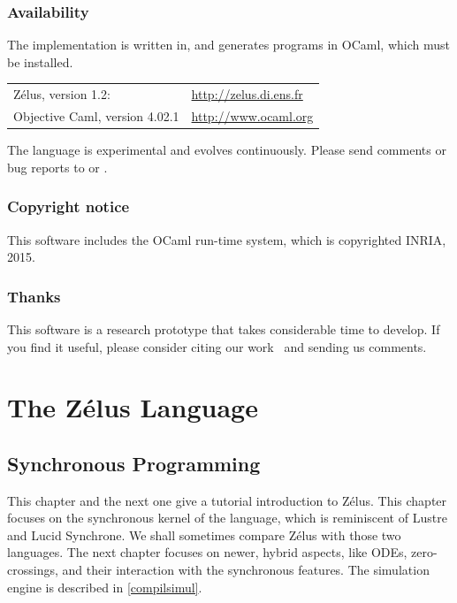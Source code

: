 \documentclass[11pt,titlepage,twoside]{report}
\newcommand{\zelus}{{\sf Z\'elus}}
\newcommand{\lustre}{{\sf Lustre}}
\newcommand{\lucy}{{\sf Lucid Synchrone}}
\newcommand{\ocaml}{{\sf OCaml}}
\begin{document}
\section*{Availability\label{availability}}
The implementation is written in, and generates programs in \ocaml, which 
must be installed.
\begin{center}
\begin{tabular}{ll}
  \zelus, version 1.2:  & \url{http://zelus.di.ens.fr} \\
  Objective Caml, version 4.02.1  & \url{http://www.ocaml.org}
\end{tabular}
\end{center}
The language is experimental and evolves continuously. Please send
comments or bug reports to  or 
. 

\section*{Copyright notice\label{copyright}}
This software includes the \ocaml{} run-time system, which is
copyrighted INRIA, 2015. 

\section*{Thanks\label{thanks}}

This software is a research prototype that takes considerable time to 
develop.
If you find it useful, please consider citing our work~\cite{lucy:hscc13} 
and sending us comments.

\cleardoublepage
\part{The Z\'elus Language\label{zeluslang}}
\cleardoublepage
\chapter{Synchronous Programming\label{syncprog}} %

This chapter and the next one give a tutorial introduction to \zelus. This
chapter focuses on the synchronous kernel of the language, which is 
reminiscent of \lustre{} and \lucy.
We shall sometimes compare \zelus{} with those two languages.
The next chapter focuses on newer, hybrid aspects, like ODEs,
zero-crossings, and their interaction with the synchronous features.
The simulation engine is described in \cref{compilsimul}.
\end{document}
